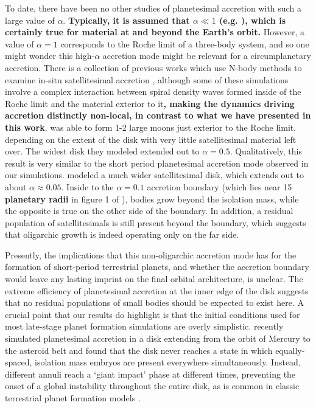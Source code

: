 \documentclass[twocolumn,linenumbers]{aastex63}
\begin{document}
To date, there have been no other studies of planetesimal accretion
with such a large value of $\alpha$. \textbf{Typically, it is assumed that $\alpha \ll 1$ (e.g. \citet{lithwick14}), which is certainly true for material at and beyond the Earth's orbit.} However, a value of $\alpha = 1$
corresponds to the Roche limit of a three-body system, and so one
might wonder this high-$\alpha$ accretion mode might be relevant for a
circumplanetary accretion. There is a collection of previous works
which use N-body methods to examine in-situ satellitesimal accretion
\citep{ida97, richardson00, kokubo00b, ida20}, although some of these simulations involve a complex interaction between spiral 
density waves formed inside of the Roche limit and the material exterior to it\textbf{, making the dynamics driving accretion distinctly non-local, in contrast to what we have presented in this work}. \citet{ida97} was able to form 1-2
large moons just exterior to the Roche limit, depending on the extent of the disk with very little satellitesimal material left over. 
The widest disk they modeled extended out to $\alpha = 0.5$. Qualitatively, this result is very similar to the short period 
planetesimal accretion mode observed in our simulations. \citet{ida20} modeled a much wider satellitesimal disk, which extends 
out to about $\alpha \approx 0.05$. Inside to the $\alpha = 0.1$ accretion boundary (which lies near 15 \textbf{planetary radii} in figure 1 of 
\citet{ida20}), bodies grow beyond the isolation mass, while the opposite is true on the other side of the boundary. In addition, a 
residual population of satellitesimals is still present beyond the boundary, which suggests that oligarchic growth is indeed 
operating only on the far side.

Presently, the implications that this non-oligarchic accretion mode has for the formation of short-period terrestrial planets, and 
whether the accretion boundary would leave any lasting imprint on the final orbital architecture, is unclear. The extreme efficiency of planetesimal accretion at the inner edge of the disk suggests that no residual populations of small bodies should be expected to exist here. A crucial point that our 
results do highlight is that the initial conditions used for most late-stage planet formation simulations are overly simplistic. 
\citet{clement20} recently simulated planetesimal accretion in a disk extending from the orbit of Mercury to the asteroid belt and 
found that the disk never reaches a state in which equally-spaced, isolation mass embryos are present everywhere 
simultaneously. Instead, different annuli reach a `giant impact' phase at different times, preventing the onset of a global instability 
throughout the entire disk, as is common in classic terrestrial planet formation models \citep{chambers01, raymond09}.
\end{document}
